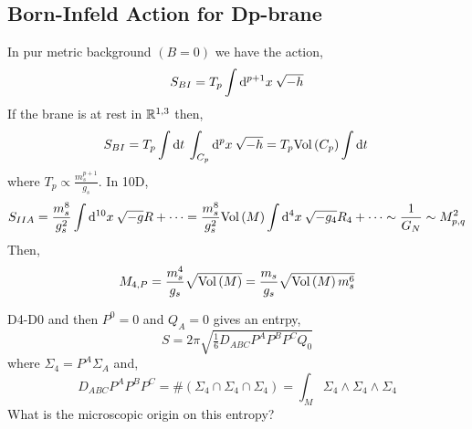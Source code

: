 \documentclass[12pt]{extarticle}
\begin{document}
\subsection{Born-Infeld Action for Dp-brane}

In pur metric background $(B = 0)$ we have the action,
\[ S_{BI} = T_p \int \mathrm{d}^{p+1} x \: \sqrt{-h} \]
If the brane is at rest in $\mathbb{R}^{1,3}$ then,
\[ S_{BI} = T_p \int \mathrm{d}t \: \int_{C_p} \mathrm{d}^{p} x \: \sqrt{-h} = T_p \mathrm{Vol}\left(C_p\right) \int \mathrm{d}t \: \]
where $T_p \propto \frac{m_s^{p+1}}{g_s}$.
In 10D,
\[ S_{IIA} = \frac{m_s^8}{g_s^2} \int \mathrm{d}^{10} x \: \sqrt{-g} R + \cdots = \frac{m_s^8}{g_s^2} \mathrm{Vol}\left(M\right) \int \mathrm{d}^{4} x \: \sqrt{-g_4} R_4 + \cdots \sim \frac{1}{G_N} \sim M_{p,q}^2 \]
Then,
\[ M_{4,P} = \frac{m_s^4}{g_s} \sqrt{\mathrm{Vol}\left(M\right)} = \frac{m_s}{g_s} \sqrt{ \mathrm{Vol}\left(M\right) m_s^6} \]
\begin{example}
D4-D0 and then $P^0 = 0$ and $Q_A = 0$ gives an entrpy,
\[ S = 2\pi \sqrt{\tfrac{1}{6} D_{ABC} P^A P^B P^C Q_0} \]
where $\Sigma_4 = P^A \Sigma_A$ and,
\[ D_{ABC} P^A P^B P^C = \# (\Sigma_4 \cap \Sigma_4 \cap \Sigma_4) = \int_M \Sigma_4 \wedge \Sigma_4 \wedge \Sigma_4 \]
What is the microscopic origin on this entropy?
\end{example}
\end{document}
